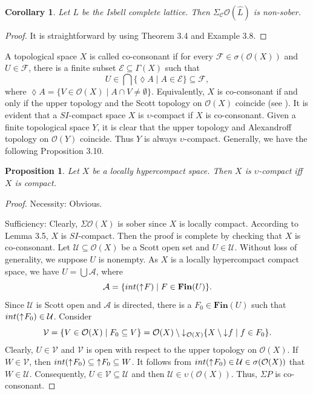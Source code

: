 \documentclass[preprint,12pt]{elsarticle}
\numberwithin{equation}{section}
\newtheorem{proposition}[theorem]{Proposition}
\newtheorem{corollary}[theorem]{Corollary}
\newcommand{\dn}{\mathord{\downarrow}\hspace{0.05em}}
\newcommand{\up}{\mathord{\uparrow}\hspace{0.05em}}
\begin{document}
\begin{corollary}  Let $L$ be the Isbell complete lattice. Then $\Sigma_{\mathcal{C}}\mathcal{O}(\hat{L})$ is non-sober.
\end{corollary}
\begin{proof}It is straightforward by using Theorem 3.4 and Example 3.8.\end{proof}

\quad A topological space $X$ is called co-consonant if for every $\mathcal{F}\in\sigma(\mathcal{O}(X))$ and $U\in\mathcal{F}$, there is a finite subset $\mathcal{E}\subseteq\Gamma(X)$ such that $$U\in\bigcap\{\lozenge A\mid A\in\mathcal{E}\}\subseteq \mathcal{F},$$ where $\lozenge A=\{V\in\mathcal{O}(X)\mid A\cap V\neq\emptyset\}$. Equivalently, $X$ is co-consonant if and only if the upper topology and the Scott topology on $\mathcal{O}(X)$ coincide (see \cite{WM34}). It is evident that a $SI$-compact space $X$ is $\upsilon$-compact if $X$ is co-consonant. Given a finite topological space $Y$, it is clear that the upper topology and Alexandroff topology on $\mathcal{O}(Y)$ coincide. Thus $Y$ is always $\upsilon$-compact. Generally, we have the following Proposition 3.10.


\begin{proposition} Let $X$ be a locally hypercompact space. Then $X$ is $\upsilon$-compact iff $X$ is compact.

\end{proposition}

\begin{proof}Necessity: Obvious.

 Sufficiency: Clearly, $\Sigma \mathcal{O}(X)$ is sober since $X$ is locally compact. According to Lemma 3.5, $X$ is $SI$-compact. Then the proof is complete by checking that $X$ is co-consonant. Let $\mathcal{U}\subseteq\mathcal{O}(X)$ be a Scott open set and $U\in\mathcal{U}$. Without loss of generality, we suppose $U$ is nonempty.
As $X$ is a locally hypercompact compact space, we have $U=\bigcup\mathcal{A}$, where $$\mathcal{A}=\{int(\up F)\mid F\in\mathbf{Fin}(U)\}.$$ Since $\mathcal{U}$ is Scott open and $\mathcal{A}$ is directed, there is a $F_{0}\in\mathbf{Fin}(U)$ such that $int(\up F_{0})\in\mathcal{U}$. Consider $$\mathcal{V}=\{V\in\mathcal{O}(X)\mid F_{0}\subseteq V\}=\mathcal{O}(X)\setminus\dn_{\mathcal{O}(X)}\{X\setminus\dn f\mid f\in F_{0}\}.$$ Clearly, $U\in\mathcal{V}$ and $\mathcal{V}$ is open with respect to the upper topology on $\mathcal{O}(X)$. If $W\in\mathcal{V}$, then $int(\up F_{0})\subseteq\up F_{0}\subseteq W$. It follows from $int(\up F_{0})\in\mathcal{U}\in\sigma(\mathcal{O}(X))$ that $W\in\mathcal{U}$. Consequently, $U\in\mathcal{V}\subseteq\mathcal{U}$ and then $\mathcal{U}\in\upsilon(\mathcal{O}(X))$. Thus, $\Sigma P$ is co-consonant.\end{proof}
\end{document}
